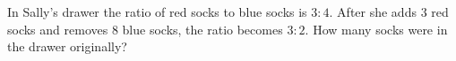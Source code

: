 In Sally's drawer the ratio of red socks to blue socks is $3:4$. After she adds $3$ red socks and removes $8$ blue socks, the ratio becomes $3:2$. How many socks were in the drawer originally?
